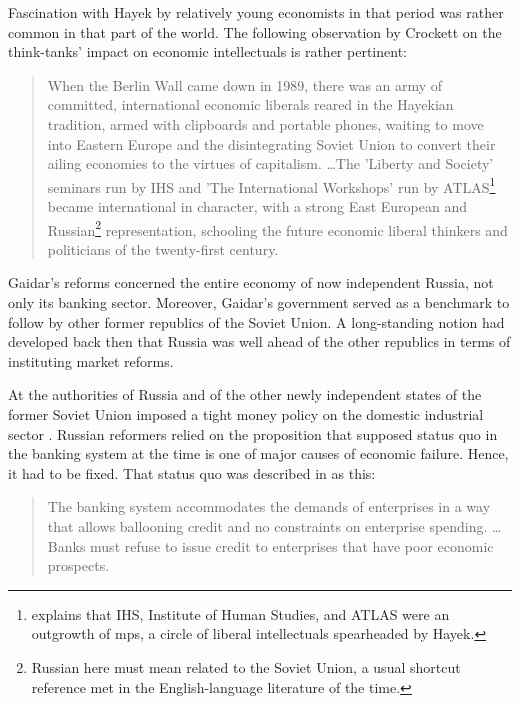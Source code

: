 Fascination with Hayek by relatively young economists in that period was rather common in that part of the world. The following observation by Crockett on the think-tanks' impact on economic intellectuals is rather pertinent:

\begin{quote}
When the Berlin Wall came down in 1989, there was an army of committed, international economic liberals reared in the Hayekian tradition, armed with clipboards and portable phones, waiting to move into Eastern Europe and the disintegrating Soviet Union to convert their ailing economies to the virtues of capitalism. \dots The 'Liberty and Society' seminars run by IHS and 'The International Workshops' run by ATLAS\footnote{\cite{cockett1995} explains that IHS, Institute of Human Studies, and ATLAS were an outgrowth of \ac{mps}, a circle of liberal intellectuals spearheaded by Hayek.} became international in character, with a strong East European and Russian\footnote{Russian here must mean related to the Soviet Union, a usual shortcut reference met in the English-language literature of the time.} representation, schooling the future economic liberal thinkers and politicians of the twenty-first century. \citep[pp.~307-308]{cockett1995}
\end{quote}

Gaidar's reforms concerned the entire economy of now independent Russia, not only its banking sector. Moreover, Gaidar's government served as a benchmark to follow by other former republics of the Soviet Union. A long-standing notion had developed back then that Russia was well ahead of the other republics in terms of instituting market reforms.

At the authorities of Russia and of the other newly independent states of the former Soviet Union imposed a tight money policy on the domestic industrial sector \citep{viksnins1997,woodruff1999}. Russian reformers relied on the proposition that supposed status quo in the banking system at the time is one of major causes of economic failure. Hence, it had to be fixed. That status quo was described in \citep{peck1991} as this:

\begin{quote}
The banking system accommodates the demands of enterprises in a way that allows ballooning credit and no constraints on enterprise spending. \dots Banks must refuse to issue credit to enterprises that have poor economic prospects. \citep[pp.~20,26]{peck1991}
\end{quote}

